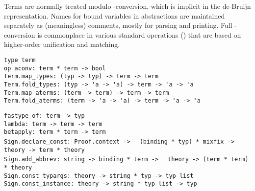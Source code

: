 \begin{isabellebody}
\begin{isamarkuptext}
  Terms are normally treated modulo -conversion, which is
  implicit in the de-Bruijn representation.  Names for bound variables
  in abstractions are maintained separately as (meaningless) comments,
  mostly for parsing and printing.  Full -conversion is
  commonplace in various standard operations ()
  that are based on higher-order unification and matching.%
\end{isamarkuptext}%
\isamarkuptrue%
%
\isadelimmlref
%
\endisadelimmlref
%
\isatagmlref
%
\begin{isamarkuptext}%
\begin{mldecls}
  \verb|type term| \\
  \verb|op aconv: term * term -> bool| \\
  \verb|Term.map_types: (typ -> typ) -> term -> term| \\
  \verb|Term.fold_types: (typ -> 'a -> 'a) -> term -> 'a -> 'a| \\
  \verb|Term.map_aterms: (term -> term) -> term -> term| \\
  \verb|Term.fold_aterms: (term -> 'a -> 'a) -> term -> 'a -> 'a| \\
  \end{mldecls}
  \begin{mldecls}
  \verb|fastype_of: term -> typ| \\
  \verb|lambda: term -> term -> term| \\
  \verb|betapply: term * term -> term| \\
  \verb|Sign.declare_const: Proof.context ->|\isasep\isanewline%
\verb|  (binding * typ) * mixfix -> theory -> term * theory| \\
  \verb|Sign.add_abbrev: string -> binding * term ->|\isasep\isanewline%
\verb|  theory -> (term * term) * theory| \\
  \verb|Sign.const_typargs: theory -> string * typ -> typ list| \\
  \verb|Sign.const_instance: theory -> string * typ list -> typ| \\
  \end{mldecls}


\end{isamarkuptext}
\end{isabellebody}
